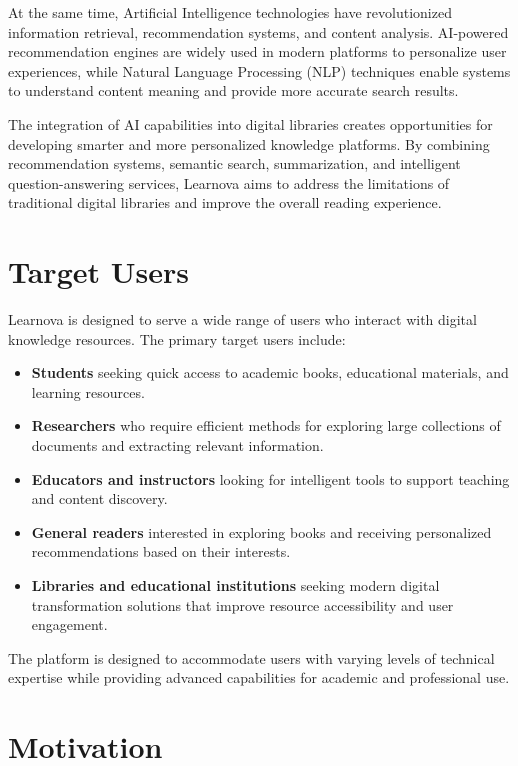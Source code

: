 At the same time, Artificial Intelligence technologies have revolutionized
information retrieval, recommendation systems, and content analysis.
AI-powered recommendation engines are widely used in modern platforms to
personalize user experiences, while Natural Language Processing (NLP)
techniques enable systems to understand content meaning and provide more
accurate search results.

The integration of AI capabilities into digital libraries creates opportunities
for developing smarter and more personalized knowledge platforms. By combining
recommendation systems, semantic search, summarization, and intelligent
question-answering services, Learnova aims to address the limitations of
traditional digital libraries and improve the overall reading experience.

\section{Target Users}
\label{sec:targetusers}

Learnova is designed to serve a wide range of users who interact with digital
knowledge resources. The primary target users include:

\begin{itemize}
  \item \textbf{Students} seeking quick access to academic books, educational
        materials, and learning resources.
  \item \textbf{Researchers} who require efficient methods for exploring large
        collections of documents and extracting relevant information.
  \item \textbf{Educators and instructors} looking for intelligent tools to
        support teaching and content discovery.
  \item \textbf{General readers} interested in exploring books and receiving
        personalized recommendations based on their interests.
  \item \textbf{Libraries and educational institutions} seeking modern digital
        transformation solutions that improve resource accessibility and user
        engagement.
\end{itemize}

The platform is designed to accommodate users with varying levels of technical
expertise while providing advanced capabilities for academic and professional use.

\section{Motivation}
\label{sec:motivation}

